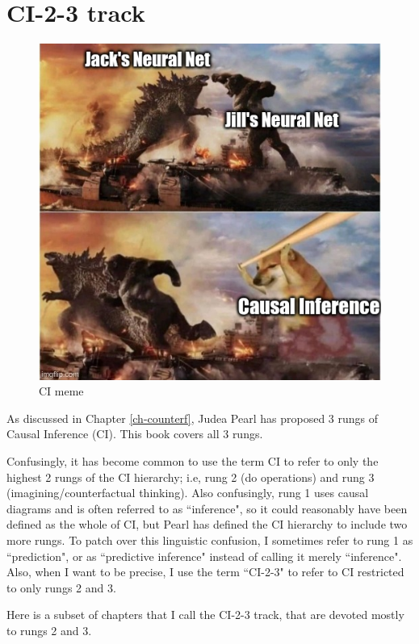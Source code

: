 \chapter*{CI-2-3 track}
\label{ci-track}

\begin{figure}[h!]
\centering
\includegraphics[width=5in]
{godzilla-kk-doge-nn-ci.jpg}
\caption{CI meme}
\label{fig-godzilla-kk-doge}
\end{figure}

As discussed in Chapter \ref{ch-counterf},
Judea Pearl has proposed 3 rungs
of Causal Inference (CI).
This book covers all 3 rungs.

Confusingly,
it has become common to use the term
CI to refer to only the highest
2 rungs of the CI hierarchy; i.e,
rung 2 (do operations)
and rung 3 (imagining/counterfactual thinking).
Also confusingly, rung 1
uses causal diagrams and
is often referred to as ``inference",
so it could reasonably have been defined as the whole
of CI, but Pearl has defined
the CI hierarchy to include two more rungs.
To patch over this linguistic confusion,
I sometimes refer to rung 1 as ``prediction",
or as ``predictive inference"
instead of calling it merely ``inference".
Also, when I want to be precise,
I use the term ``CI-2-3" to
refer to CI restricted to only rungs 2 and 3.


Here is a subset of chapters
that I call
the CI-2-3 track,
that are devoted mostly to rungs 2 and 3.


